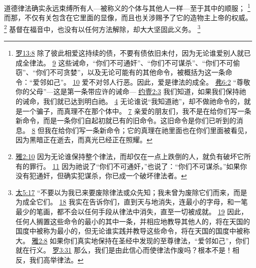 \documentclass[12pt, a4paper, oneside]{ctexart}
\newcounter{parnum}[section]
\newcommand{\N}{%
   \noindent\refstepcounter{parnum}%
    \makebox[\parindent][l]{\textbf{\arabic{parnum}.}}}
\begin{document}
\N 道德律法确实永远束缚所有人---被称义的个体与其他人一样---至于其中的顺服；
	\footnote {
		\href{https://biblehub.com/romans/13-8.htm}{罗13:8} 除了彼此相爱这持续的债，不要有债依旧未付，因为无论谁爱别人就已成全律法。
		\href{https://biblehub.com/romans/13-9.htm}{9} 这些诫命，“你们不可通奸”、“你们不可谋杀”、“你们不可偷窃”、“你们不可贪婪”，以及无论可能有的其他命令，被概括为这一条命令：“爱邻如己”。
		\href{https://biblehub.com/romans/13-10.htm}{10} 爱不对邻人行恶。因此，爱是律法的成全。
		\href{https://biblehub.com/ephesians/6-2.htm}{弗6:2} “尊敬你的父母”---这是第一条带应许的诫命---
		\href{https://biblehub.com/1_john/2-3.htm}{约壹2:3} 我们知道，如果我们保持祂的诫命，我们就已达到明白祂。
		\href{https://biblehub.com/1_john/2-4.htm}{4} 无论谁说“我知道祂”，却不做祂命令的，就是一个骗子，而真理不在那个体中。
		\href{https://biblehub.com/1_john/2-7.htm}{7} 亲爱的朋友们，我不是在给你们写一条新命令，而是一条你们自起初就已有的旧命令。这旧命令是你们已听到的消息。
		\href{https://biblehub.com/1_john/2-8.htm}{8} 但我在给你们写一条新命令；它的真理在祂里面也在你们里面被看见，因为黑暗正在逝去，而真光已经正在照耀。
	}
	而那，不仅有关包含在它里面的显像，而且也关涉赐予了它的造物主上帝的权威。
	\footnote {
		\href{https://biblehub.com/james/2-10.htm}{雅2:10} 因为无论谁保持整个律法，而却仅在一点上跌倒的人，就负有破坏它所有的罪行。
		\href{https://biblehub.com/james/2-11.htm}{11} 因为祂说了“你们不可通奸，”也说了：“你们不可谋杀。”如果你没有犯通奸，但确实犯谋杀，你已成一个破坏律法者。
	}
	基督在福音中，也没有以任何方法解除，却大大坚固此义务。
	\footnote {
		\href{https://biblehub.com/matthew/5-17.htm}{太5:17} “不要以为我已来要废除律法或众先知；我未曾为废除它们而来，而是为成全它们。
		\href{https://biblehub.com/matthew/5-18.htm}{18} 我实在告诉你们，直到天与地消失，连最小的字母，和一笔最少的笔画，都不会以任何手段从律法中消失，直至一切被成就。
		\href{https://biblehub.com/matthew/5-19.htm}{19} 因此，任何人搁置这些命令的最小的其中一条，并相应地教导其他人的，将在天国的国度中被称为最小的，但无论谁实践并教导这些命令，将在天国的国度中被称大。
		\href{https://biblehub.com/james/2-8.htm}{雅2:8} 如果你们真实地保持在圣经中发现的至尊律法，“爱邻如己”，你们就在行义。
		\href{https://biblehub.com/romans/3-31.htm}{罗3:31} 那么，我们是由此信心而使律法作废吗？根本不是！相反，我们高举律法。
	}
\end{document}
